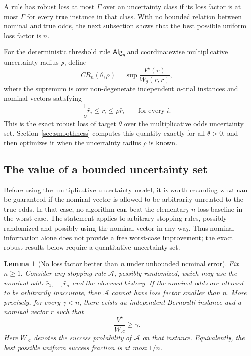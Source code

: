 \documentclass[11pt,a4paper]{article}
\newtheorem{lemma}{Lemma}
\newcommand{\alg}{\mathsf{Alg}}
\begin{document}
A rule has robust loss at most \(\Gamma\) over an uncertainty class if its loss
factor is at most \(\Gamma\) for every true instance in that class.  With no
bounded relation between nominal and true odds, the next subsection shows that
the best possible uniform loss factor is \(n\).

For the deterministic threshold rule \(\alg_\theta\) and coordinatewise
multiplicative uncertainty radius \(\rho\), define
\[
  CR_n(\theta,\rho)
  =
  \sup
  \frac{V^\star(r)}{W_\theta(r,\bar r)},
\]
where the supremum is over non-degenerate independent \(n\)-trial instances and
nominal vectors satisfying
\[
  \frac1\rho\bar r_i\le r_i\le\rho\bar r_i
  \qquad\text{for every }i.
\]
This is the exact robust loss of target \(\theta\) over the multiplicative odds
uncertainty set.  Section~\ref{sec:smoothness} computes this quantity exactly
for all \(\theta>0\), and then optimizes it when the uncertainty radius \(\rho\)
is known.

\subsection{The value of a bounded uncertainty set}
\label{subsec:no-free-robustness}

Before using the multiplicative uncertainty model, it is worth recording what
can be guaranteed if the nominal vector is allowed to be arbitrarily unrelated
to the true odds.  In that case, no algorithm can beat the elementary \(n\)-loss
baseline in the worst case.  The statement applies to arbitrary stopping rules,
possibly randomized and possibly using the nominal vector in any way.  Thus
nominal information alone does not provide a free worst-case improvement; the
exact robust results below require a quantitative uncertainty set.

\begin{lemma}[No loss factor better than \(n\) under unbounded nominal error]
\label{lem:no-better-than-n-robust}
Fix \(n\ge1\).  Consider any stopping rule \(\mathcal A\), possibly randomized,
which may use the nominal odds \(\bar r_1,\ldots,\bar r_n\) and the observed
history.  If the nominal odds are allowed to be arbitrarily inaccurate, then
\(\mathcal A\) cannot have loss factor smaller than \(n\).  More precisely, for
every \(\gamma<n\), there exists an independent Bernoulli instance and a
nominal vector \(\bar r\) such that
\[
  \frac{V^\star}{W_{\mathcal A}}\ge \gamma .
\]
Here \(W_{\mathcal A}\) denotes the success probability of \(\mathcal A\) on
that instance.  Equivalently, the best possible uniform success fraction is at
most \(1/n\).
\end{lemma}
\end{document}
